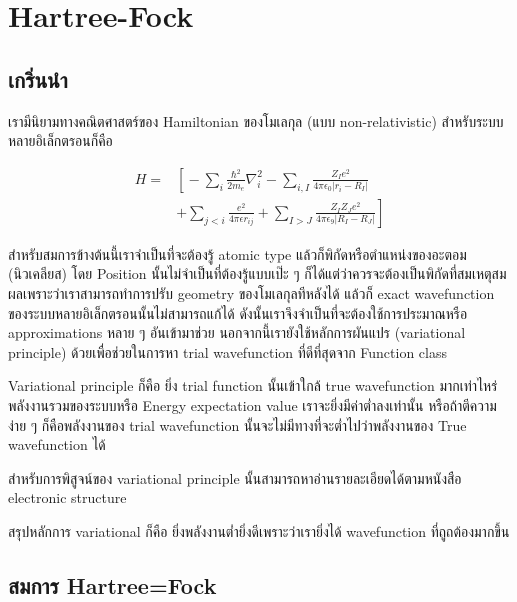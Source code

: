 
\chapter{Hartree-Fock}

\section{เกริ่นนำ}

เรามีนิยามทางคณิตศาสตร์ของ Hamiltonian ของโมเลกุล (แบบ non-relativistic) สำหรับระบบหลายอิเล็กตรอนก็คือ

\begin{equation}
    \begin{aligned}
        H = &
        \left[ \right.
        -\sum_{i} \frac{\hbar^{2}}{2m_{e}} \nabla^{2}_{i}
        -\sum_{i,I} \frac{Z_{I} e^{2}}{4\pi\epsilon_{0} |r_{i} - R_{I}|} \\
            & +\sum_{j<i} \frac{e^{2}}{4\pi\epsilon r_{ij}}
        +\sum_{I>J} \frac{Z_{I} Z_{J} e^{2}}{4\pi\epsilon_{9} |R_{I} - R_{J}|}
        \left. \right]
    \end{aligned}
\end{equation}

สำหรับสมการข้างต้นนี้เราจำเป็นที่จะต้องรู้ atomic type แล้วก็พิกัดหรือตำแหน่งของอะตอม (นิวเคลียส)
โดย Position นั้นไม่จำเป็นที่ต้องรู้แบบเป๊ะ ๆ ก็ได้แต่ว่าควรจะต้องเป็นพิกัดที่สมเหตุสมผลเพราะว่าเราสามารถทำการปรับ
geometry ของโมเลกุลทีหลังได้ แล้วก็ exact wavefunction ของระบบหลายอิเล็กตรอนนั้นไม่สามารถแก้ได้
ดังนั้นเราจึงจำเป็นที่จะต้องใช้การประมาณหรือ approximations หลาย ๆ อันเข้ามาช่วย นอกจากนี้เรายังใช้หลักการผันแปร
(variational principle) ด้วยเพื่อช่วยในการหา trial wavefunction ที่ดีที่สุดจาก Function class

Variational principle ก็คือ ยิ่ง trial function นั้นเข้าใกล้ true wavefunction มากเท่าไหร่
พลังงานรวมของระบบหรือ Energy expectation value เราจะยิ่งมีค่าต่ำลงเท่านั้น หรือถ้าตีความง่าย ๆ
ก็คือพลังงานของ trial wavefunction นั้นจะไม่มีทางที่จะต่ำไปว่าพลังงานของ True wavefunction ได้

สำหรับการพิสูจน์ของ variational principle นั้นสามารถหาอ่านรายละเอียดได้ตามหนังสือ electronic
structure

สรุปหลักการ variational ก็คือ ยิ่งพลังงานต่ำยิ่งดีเพราะว่าเรายิ่งได้ wavefunction ที่ถูถต้องมากขึ้น

\section{สมการ Hartree=Fock}

